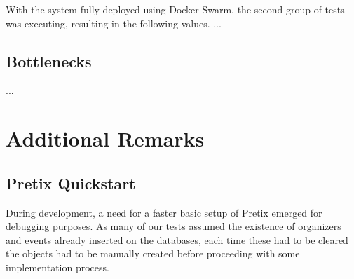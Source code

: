 \documentclass[12pt]{article}
\begin{document}








With the system fully deployed using Docker Swarm, the second group of tests was executing, resulting in the following values.
... 

\subsection{Bottlenecks} \label{performance.bottlenecks} %


...

\newpage
\section{Additional Remarks} \label{remarks} %

\subsection{Pretix Quickstart} \label{remarks.quickstart} %


During development, a need for a faster basic setup of Pretix emerged for debugging purposes.
As many of our tests assumed the existence of organizers and events already inserted on the databases, each time these had to be cleared the objects had to be 
manually created before proceeding with some implementation process.
\end{document}

